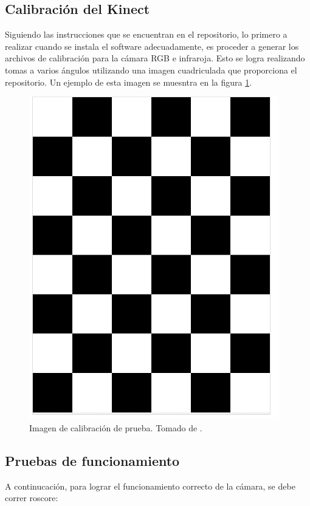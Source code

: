 \subsection{Calibración del Kinect}

Siguiendo las instrucciones que se encuentran en el repositorio, lo primero a realizar cuando se instala el software adecuadamente, es proceder a generar los archivos de calibración para la cámara RGB e infraroja. Esto se logra realizando tomas a varios ángulos utilizando una imagen cuadriculada que proporciona el repositorio. Un ejemplo de esta imagen se muesntra en la figura \ref{F:cuadricula}.

\begin{figure}[H]
\centering
\includegraphics[scale=0.6]{imagenes/calibracion.png}
\caption{Imagen de calibración de prueba. Tomado de \cite{iai_kinect2}.}
\label{F:cuadricula}
\end{figure}

\subsection{Pruebas de funcionamiento}

A continucación, para lograr el funcionamiento correcto de la cámara, se debe correr roscore:

